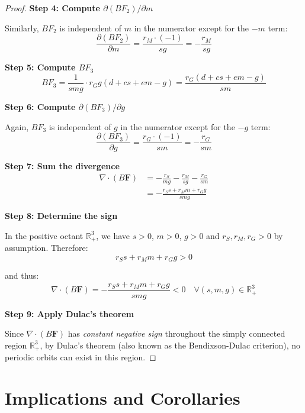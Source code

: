 \documentclass[11pt]{article}
\begin{document}
\begin{proof}
\textbf{Step 4: Compute $\partial(BF_2)/\partial m$}

Similarly, $BF_2$ is independent of $m$ in the numerator except for the $-m$ term:
\begin{equation}
\frac{\partial(BF_2)}{\partial m} = \frac{r_M \cdot (-1)}{sg} = -\frac{r_M}{sg}
\end{equation}

\textbf{Step 5: Compute $BF_3$}
\begin{equation}
BF_3 = \frac{1}{smg} \cdot r_G g(d + c s + e m - g) = \frac{r_G(d + c s + e m - g)}{sm}
\end{equation}

\textbf{Step 6: Compute $\partial(BF_3)/\partial g$}

Again, $BF_3$ is independent of $g$ in the numerator except for the $-g$ term:
\begin{equation}
\frac{\partial(BF_3)}{\partial g} = \frac{r_G \cdot (-1)}{sm} = -\frac{r_G}{sm}
\end{equation}

\textbf{Step 7: Sum the divergence}
\begin{align}
\nabla \cdot (B \mathbf{F}) &= -\frac{r_S}{mg} - \frac{r_M}{sg} - \frac{r_G}{sm}\\
&= -\frac{r_S s + r_M m + r_G g}{smg}
\end{align}

\textbf{Step 8: Determine the sign}

In the positive octant $\mathbb{R}^3_+$, we have $s > 0$, $m > 0$, $g > 0$ and $r_S, r_M, r_G > 0$ by assumption. Therefore:
\begin{equation}
r_S s + r_M m + r_G g > 0
\end{equation}

and thus:
\begin{equation}
\nabla \cdot (B \mathbf{F}) = -\frac{r_S s + r_M m + r_G g}{smg} < 0 \quad \forall (s,m,g) \in \mathbb{R}^3_+
\end{equation}

\textbf{Step 9: Apply Dulac's theorem}

Since $\nabla \cdot (B \mathbf{F})$ has \emph{constant negative sign} throughout the simply connected region $\mathbb{R}^3_+$, by Dulac's theorem (also known as the Bendixson-Dulac criterion), no periodic orbits can exist in this region.
\end{proof}

\section{Implications and Corollaries}
\end{document}
